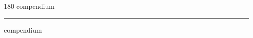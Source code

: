 
\begin{frame}
\begin{center}
\begin{turn}{180}
{\fontsize{2.5cm}{1em}\selectfont compendium}
\end{turn}
\vspace{1em}\par  
\hrule
\vspace{1em}\par  
{\fontsize{2.5cm}{1em}\selectfont compendium}
\end{center}
\end{frame}
